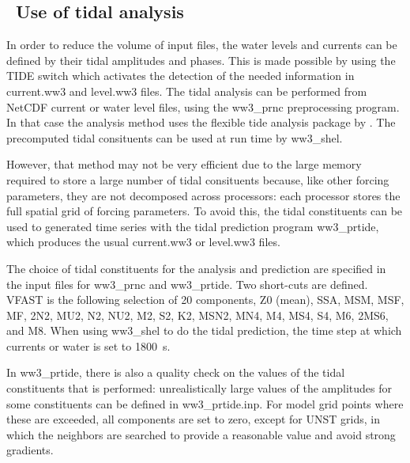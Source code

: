 \vssub
\subsection{~Use of tidal analysis} \label{sub:num_tide}

\noindent
In order to reduce the volume of input files, the water levels and currents
can be defined by their tidal amplitudes and phases. This is made possible by
using the {\code TIDE} switch which activates the detection of the needed
information in current.ww3 and level.ww3 files. The tidal analysis can be
performed from NetCDF current or water level files, using the {\file
  ww3\_prnc} preprocessing program. In that case the analysis method uses the
flexible tide analysis package by \cite{art:For09}. The precomputed tidal consituents 
can be used at run time by {\file ww3\_shel}.

However, that method may not be very efficient due to the large memory 
required to store a large number of tidal consituents because, like other 
forcing parameters, they are not decomposed across processors: each processor stores the full 
spatial grid of forcing parameters. To avoid this,  
the tidal constituents can be used to generated time series with the tidal
prediction program {\file ww3\_prtide}, which produces the usual {\file current.ww3} or 
{\file level.ww3} files.

The choice of tidal constituents for the analysis and prediction are specified
in the input files for {\file ww3\_prnc} and {\file ww3\_prtide}. Two
short-cuts are defined. {\code VFAST} is the following selection of 20
components, Z0 (mean), SSA, MSM, MSF, MF, 2N2, MU2, N2, NU2, M2, S2, K2, MSN2,
MN4, M4, MS4, S4, M6, 2MS6, and M8. When using {\code ww3\_shel} to do the
tidal prediction, the time step at which currents or water is set to 1800~s.

In {\file ww3\_prtide}, there is also a quality check on the values of the
tidal constituents that is performed: unrealistically large values of the
amplitudes for some constituents can be defined in {\file ww3\_prtide.inp}.
For model grid points where these are exceeded, all components are set to
zero, except for UNST grids, in which the neighbors are searched to provide a
reasonable value and avoid strong gradients.
